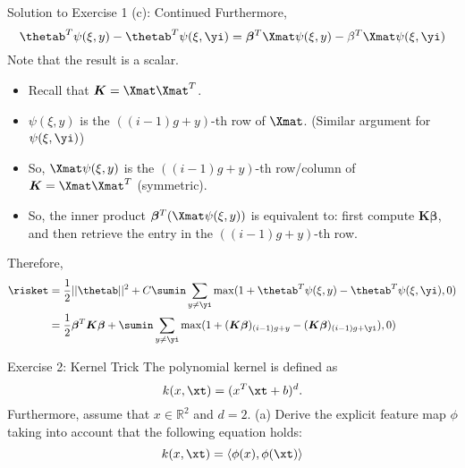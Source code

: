 \documentclass[aspectratio=169]{beamer}
\newcommand{\Kmat}{\bm{K}}
\newcommand{\psixiy}{\psi(\xi, y)}
\newcommand{\psixiyi}{\psi(\xi, \yi)}
\newcommand{\betab}{\bm{\beta}}
\begin{document}
\begin{frame}{Solution to Exercise 1 (c): Continued}
Furthermore,
	$$\thetab^T \psixiy - \thetab^T \psixiyi = \betab^T \Xmat \psixiy - \beta^T\Xmat\psixiyi$$
	Note that the result is a scalar.
	\begin{itemize}
		\item Recall that $\Kmat = \Xmat \Xmat^T$. 
		\item $\psixiy$ is the $((i - 1) g + y)$-th row of $\Xmat$. (Similar argument for $\psixiyi$)
		\item So, $\Xmat \psixiy$ is the $((i - 1) g + y)$-th row/column of $\Kmat = \Xmat \Xmat^T$ (symmetric).
		\item So, the inner product $\betab^T (\Xmat \psixiy)$ is equivalent to: first compute $\Kmat \betab$, and then retrieve the entry in the $((i - 1) g + y)$-th row.
	\end{itemize}
	Therefore, 
	\begin{align*}
		\risket &= \frac{1}{2} ||\thetab||^2 + C\sumin \sum_{y \neq \yi} \max(1 + \thetab^T \psixiy - \thetab^T \psixiyi, 0) \\
		&= \frac{1}{2} \betab^T \Kmat \betab + \sumin \sum_{y \neq \yi} \max(1 + (\Kmat \betab)_{(i-1)g + y} - (\Kmat \betab)_{(i-1)g + \yi}), 0)
	\end{align*}
\end{frame}


\begin{frame}{Exercise 2: Kernel Trick}
	The polynomial kernel is defined as 
	$$k(x, \xt) = (x^T \xt + b)^d.$$
	Furthermore, assume that $x \in \mathbb{R}^2$ and $d = 2$.
	(a) Derive the explicit feature map $\phi$ taking into account that the following equation holds:
	$$k(x, \xt) = \langle \phi(x), \phi(\xt) \rangle$$
	
\end{frame}
\end{document}

